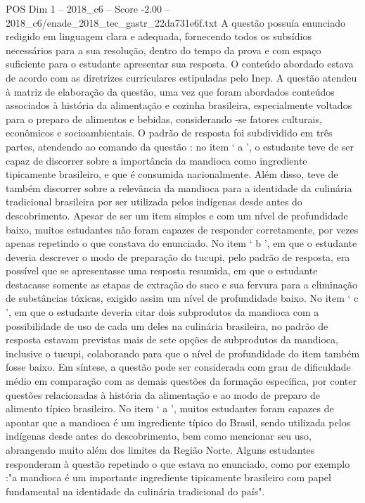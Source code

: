 \begin{textsample}{POS Dim 1 – 2018\_c6 – Score -2.00 – 2018\_c6/enade\_2018\_tec\_gastr\_22da731e6f.txt}
A questão possuía enunciado redigido em linguagem clara e adequada, fornecendo todos os subsídios necessários para a sua resolução, dentro do tempo da prova e com espaço suficiente para o estudante apresentar sua resposta.
O conteúdo abordado estava de acordo com as diretrizes curriculares estipuladas pelo Inep.
A questão atendeu à matriz de elaboração da questão, uma vez que foram abordados conteúdos associados à história da alimentação e cozinha brasileira, especialmente voltados para o preparo de alimentos e bebidas, considerando -se fatores culturais, econômicos e socioambientais.
O padrão de resposta foi subdividido em três partes, atendendo ao comando da questão : no item ‘ a ’, o estudante teve de ser capaz de discorrer sobre a importância da mandioca como ingrediente tipicamente brasileiro, e que é consumida nacionalmente.
Além disso, teve de também discorrer sobre a relevância da mandioca para a identidade da culinária tradicional brasileira por ser utilizada pelos indígenas desde antes do descobrimento.
Apesar de ser um item simples e com um nível de profundidade baixo, muitos estudantes não foram capazes de responder corretamente, por vezes apenas repetindo o que constava do enunciado.
No item ‘ b ’, em que o estudante deveria descrever o modo de preparação do tucupi, pelo padrão de resposta, era possível que se apresentasse uma resposta resumida, em que o estudante destacasse somente as etapas de extração do suco e sua fervura para a eliminação de substâncias tóxicas, exigido assim um nível de profundidade baixo.
No item ‘ c ’, em que o estudante deveria citar dois subprodutos da mandioca com a possibilidade de uso de cada um deles na culinária brasileira, no padrão de resposta estavam previstas mais de sete opções de subprodutos da mandioca, inclusive o tucupi, colaborando para que o nível de profundidade do item também fosse baixo.
Em síntese, a questão pode ser considerada com grau de dificuldade médio em comparação com as demais questões da formação específica, por conter questões relacionadas à história da alimentação e ao modo de preparo de alimento típico brasileiro.
No item ‘ a ’, muitos estudantes foram capazes de apontar que a mandioca é um ingrediente típico do Brasil, sendo utilizada pelos indígenas desde antes do descobrimento, bem como mencionar seu uso, abrangendo muito além dos limites da Região Norte.
Alguns estudantes responderam à questão repetindo o que estava no enunciado, como por exemplo :"a mandioca é um importante ingrediente tipicamente brasileiro com papel fundamental na identidade da culinária tradicional do país".

\end{textsample}
